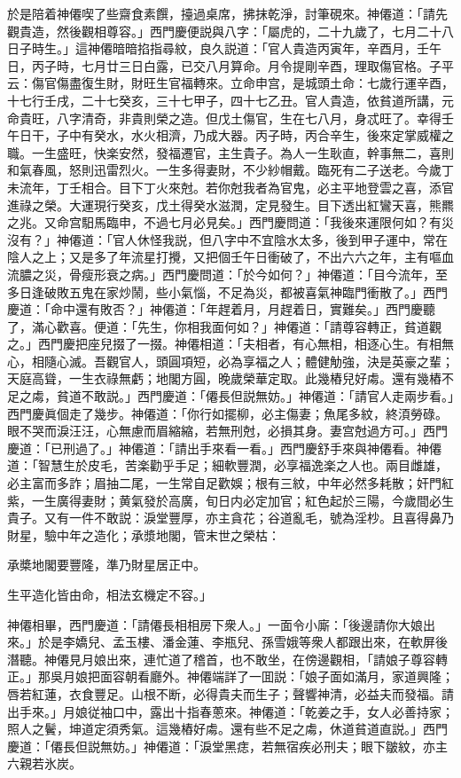 於是陪着神僊喫了些齋食素饌，擡過桌席，拂抹乾淨，討筆硯來。神僊道：「請先觀貴造，然後觀相尊容。」西門慶便説與八字：「屬虎的，二十九歲了，七月二十八日子時生。」這神僊暗暗掐指尋紋，良久説道：「官人貴造丙寅年，辛酉月，壬午日，丙子時，七月廿三日白露，已交八月算命。月令提剛辛酉，理取傷官格。子平云：傷官傷盡復生財，財旺生官福轉來。立命申宫，是城頭土命：七歲行運辛酉，十七行壬戌，二十七癸亥，三十七甲子，四十七乙丑。官人貴造，依貧道所講，元命貴旺，八字清奇，非貴則榮之造。但戊土傷官，生在七八月，身忒旺了。幸得壬午日干，子中有癸水，水火相濟，乃成大器。丙子時，丙合辛生，後來定掌威權之職。一生盛旺，快楽安然，發福遷官，主生貴子。為人一生耿直，幹事無二，喜則和氣春風，怒則迅雷烈火。一生多得妻財，不少紗帽戴。臨死有二子送老。今歲丁未流年，丁壬相合。目下丁火來尅。若你尅我者為官鬼，必主平地登雲之喜，添官進祿之榮。大運現行癸亥，戊土得癸水滋潤，定見發生。目下透出紅鸞天喜，熊羆之兆。又命宫馹馬臨申，不過七月必見矣。」西門慶問道：「我後來運限何如？有災沒有？」神僊道：「官人休怪我説，但八字中不宜陰水太多，後到甲子運中，常在陰人之上；又是多了年流星打攪，又把個壬午日衝破了，不出六六之年，主有嘔血流膿之災，骨瘦形衰之病。」西門慶問道：「於今如何？」神僊道：「目今流年，至多日逢破敗五鬼在家炒鬧，些小氣惱，不足為災，都被喜氣神臨門衝散了。」西門慶道：「命中還有敗否？」神僊道：「年趕着月，月趕着日，實難矣。」西門慶聽了，滿心歡喜。便道：「先生，你相我面何如？」神僊道：「請尊容轉正，貧道觀之。」西門慶把座兒掇了一掇。神僊相道：「夫相者，有心無相，相逐心生。有相無心，相隨心滅。吾觀官人，頭圓項短，必為享福之人；體健觔強，決是英豪之輩；天庭高聳，一生衣祿無虧；地閣方圓，晚歲榮華定取。此幾樁兒好䖏。還有幾樁不足之䖏，貧道不敢説。」西門慶道：「僊長但説無妨。」神僊道：「請官人走兩步看。」西門慶眞個走了幾步。神僊道：「你行如擺柳，必主傷妻；魚尾多紋，終湏勞碌。眼不哭而淚汪汪，心無慮而眉縮縮，若無刑尅，必損其身。妻宫尅過方可。」西門慶道：「已刑過了。」神僊道：「請出手來看一看。」西門慶舒手來與神僊看。神僊道：「智慧生於皮毛，苦楽勸乎手足；細軟豐潤，必享福逸楽之人也。兩目雌雄，必主富而多詐；眉抽二尾，一生常自足歡娛；根有三紋，中年必然多耗散；奸門紅紫，一生廣得妻財；黄氣發於高廣，旬日内必定加官；紅色起於三陽，今歲間必生貴子。又有一件不敢説：淚堂豐厚，亦主貪花；谷道亂毛，號為淫杪。且喜得鼻乃財星，驗中年之造化；承漿地閣，管末世之榮枯：

\begin{myquote}
承槳地閣要豐隆，準乃財星居正中。

生平造化皆由命，相法玄機定不容。」
\end{myquote}

神僊相畢，西門慶道：「請僊長相相房下衆人。」一面令小廝：「後邊請你大娘出來。」於是李嬌兒、孟玉樓、潘金蓮、李瓶兒、孫雪娥等衆人都跟出來，在軟屏後潛聽。神僊見月娘出來，連忙道了稽首，也不敢坐，在傍邊觀相，「請娘子尊容轉正。」那吳月娘把面容朝看廳外。神僊端詳了一囬説：「娘子面如滿月，家道興隆；唇若紅蓮，衣食豐足。山根不断，必得貴夫而生子；聲響神清，必益夫而發福。請出手來。」月娘従袖口中，露出十指春蔥來。神僊道：「乾姜之手，女人必善持家；照人之鬢，坤道定須秀氣。這幾樁好䖏。還有些不足之䖏，休道貧道直説。」西門慶道：「僊長但説無妨。」神僊道：「淚堂黑痣，若無宿疾必刑夫；眼下皺紋，亦主六親若氷炭。


